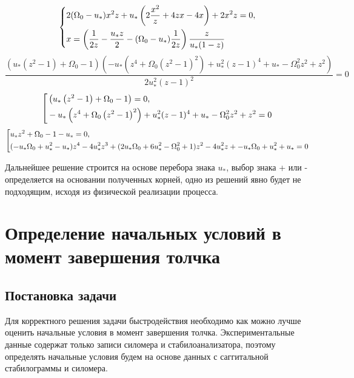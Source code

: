 \documentclass[a4paper,12pt, openany]{book}
\theoremstyle{plain} %
\theoremstyle{definition} %
\theoremstyle{remark} %
\numberwithin{equation}{chapter}
\begin{document}
{\begin{equation}
    \left\{ {\begin{aligned}
                 & 2(\Omega_0-u_*)x^2z+u_*\left(2\frac{x^2}{z}+4zx-4x\right)+2x^2z=0, \hfill                       \\
                 & x=\left( \frac{1}{2z}-\frac{u_*z}{2}-(\Omega_0-u_*)\frac{1}{2z}\right)\frac{z}{u_*(1-z)} \hfill \\
            \end{aligned}} \right.
\end{equation}
\[
    \frac{\left(u_* \left(z^2-1\right)+\Omega _0-1\right) \left(-u_* \left(z^4+\Omega _0 \left(z^2-1\right)^2\right)+u_*^2 (z-1)^4+u_*-\Omega _0^2 z^2+z^2\right)}{2 u_*^2 (z-1)^2}=0
\]
\begin{equation}
    \left[ {\begin{aligned}
                 & \left(u_* \left(z^2-1\right)+\Omega _0-1\right)=0, \hfill                                           \\
                 & -u_* \left(z^4+\Omega _0 \left(z^2-1\right)^2\right)+u_*^2 (z-1)^4+u_*-\Omega _0^2 z^2+z^2=0 \hfill \\
            \end{aligned}} \right.
\end{equation}
\begin{equation}\label{final_polynom}
    \left[ {\begin{aligned}
                 & u_*z^2+\Omega _0-1-u_*=0, \hfill                                                                                               \\
                 & (-u_* \Omega _0+u_*^2-u_*)z^4-4 u_*^2z^3+(2 u_* \Omega _0+6 u_*^2-\Omega _0^2+1)z^2-4 u_*^2z+-u_* \Omega _0+u_*^2+u_*=0 \hfill \\
            \end{aligned}} \right.
\end{equation}

Дальнейшее решение строится на основе перебора знака $u_\ast$, выбор знака + или - определяется на основании полученных корней,
одно из решений явно будет не подходящим, исходя из физической реализации процесса.



\newpage
\chapter{Определение начальных условий в момент завершения толчка}
\section{Постановка задачи}
Для корректного решения задачи быстродействия необходимо как можно лучше оценить
начальные условия в момент завершения толчка. Экспериментальные данные содержат только записи силомера
и стабилоанализатора, поэтому определять начальные условия будем на основе данных с саггитальной стабилограммы и силомера.

}
\end{document}
